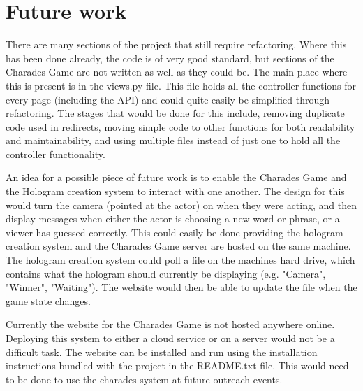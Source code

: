 \section{Future work}
There are many sections of the project that still require refactoring. Where this has been done already, the code is of very good standard, but sections of the Charades Game are not written as well as they could be. The main place where this is present is in the views.py file. This file holds all the controller functions for every page (including the API) and could quite easily be simplified through refactoring. The stages that would be done for this include, removing duplicate code used in redirects, moving simple code to other functions for both readability and maintainability, and using multiple files instead of just one to hold all the controller functionality.

An idea for a possible piece of future work is to enable the Charades Game and the Hologram creation system to interact with one another. The design for this would turn the camera (pointed at the actor) on when they were acting, and then display messages when either the actor is choosing a new word or phrase, or a viewer has guessed correctly. This could easily be done providing the hologram creation system and the Charades Game server are hosted on the same machine. The hologram creation system could poll a file on the machines hard drive, which contains what the hologram should currently be displaying (e.g. "Camera", "Winner", "Waiting"). The website would then be able to update the file when the game state changes.  

Currently the website for the Charades Game is not hosted anywhere online. Deploying this system to either a cloud service or on a server would not be a difficult task. The website can be installed and run using the installation instructions bundled with the project in the README.txt file. This would need to be done to use the charades system at future outreach events.
